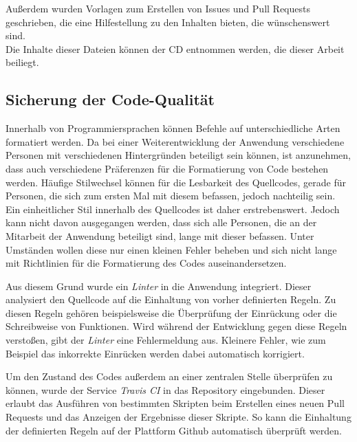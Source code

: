 Außerdem wurden Vorlagen zum Erstellen von Issues\footnotemark{} und Pull Requests geschrieben, die eine Hilfestellung zu den Inhalten bieten, die wünschenswert sind.\\
Die Inhalte dieser Dateien können der CD entnommen werden, die dieser Arbeit beiliegt.


\subsection{Sicherung der Code-Qualität}
Innerhalb von Programmiersprachen können Befehle auf unterschiedliche Arten formatiert werden. Da bei einer Weiterentwicklung der Anwendung verschiedene Personen mit verschiedenen Hintergründen beteiligt sein können, ist anzunehmen, dass auch verschiedene Präferenzen für die Formatierung von Code bestehen werden.
Häufige Stilwechsel können für die Lesbarkeit des Quellcodes, gerade für Personen, die sich zum ersten Mal mit diesem befassen, jedoch nachteilig sein. Ein einheitlicher Stil innerhalb des Quellcodes ist daher erstrebenswert. Jedoch kann nicht davon ausgegangen werden, dass sich alle Personen, die an der Mitarbeit der Anwendung beteiligt sind, lange mit dieser befassen. Unter Umständen wollen diese nur einen kleinen Fehler beheben und sich nicht lange mit Richtlinien für die Formatierung des Codes auseinandersetzen.

Aus diesem Grund wurde ein \textit{Linter} in die Anwendung integriert. Dieser analysiert den Quellcode auf die Einhaltung von vorher definierten Regeln. Zu diesen Regeln gehören beispielsweise die Überprüfung der Einrückung oder die Schreibweise von Funktionen.
Wird während der Entwicklung gegen diese Regeln verstoßen, gibt der \textit{Linter} eine Fehlermeldung aus. Kleinere Fehler, wie zum Beispiel das inkorrekte Einrücken werden dabei automatisch korrigiert.

Um den Zustand des Codes außerdem an einer zentralen Stelle überprüfen zu können, wurde der Service \textit{Travis CI}\footnotemark{} in das Repository eingebunden. Dieser erlaubt das Ausführen von bestimmten Skripten beim Erstellen eines neuen Pull Requests und das Anzeigen der Ergebnisse dieser Skripte. So kann die Einhaltung der definierten Regeln auf der Plattform Github automatisch überprüft werden.


